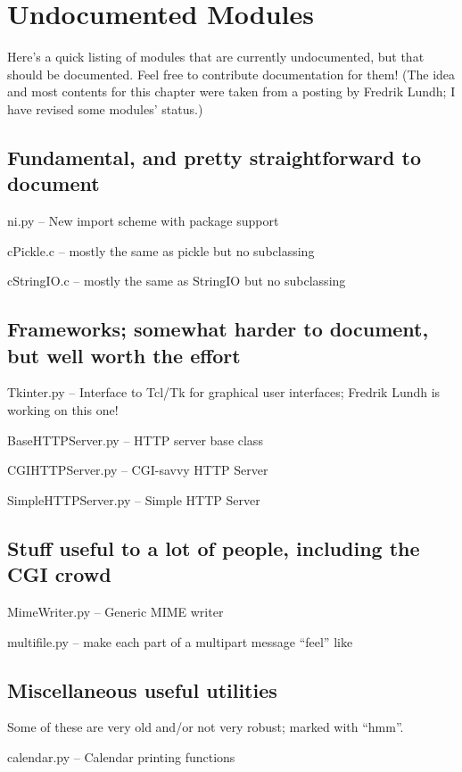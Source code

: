 \chapter{Undocumented Modules}

Here's a quick listing of modules that are currently undocumented, but
that should be documented.  Feel free to contribute documentation for
them!  (The idea and most contents for this chapter were taken from a
posting by Fredrik Lundh; I have revised some modules' status.)


\section{Fundamental, and pretty straightforward to document}

ni.py -- New import scheme with package support

cPickle.c -- mostly the same as pickle but no subclassing

cStringIO.c -- mostly the same as StringIO but no subclassing


\section{Frameworks; somewhat harder to document, but
well worth the effort}

Tkinter.py -- Interface to Tcl/Tk for graphical user interfaces;
Fredrik Lundh is working on this one!

BaseHTTPServer.py -- HTTP server base class

CGIHTTPServer.py -- CGI-savvy HTTP Server

SimpleHTTPServer.py -- Simple HTTP Server


\section{Stuff useful to a lot of people, including the CGI crowd}

MimeWriter.py -- Generic MIME writer

multifile.py -- make each part of a multipart message ``feel'' like


\section{Miscellaneous useful utilities}

Some of these are very old and/or not very robust; marked with ``hmm''.

calendar.py -- Calendar printing functions

